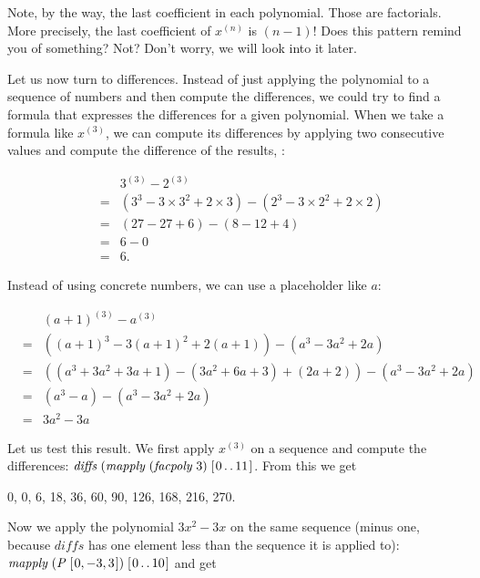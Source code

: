 \documentclass[tikz]{scrreprt}
\newcommand{\Conid}[1]{\mathit{#1}}
\newcommand{\Varid}[1]{\mathit{#1}}
\begin{document}
Note, by the way, the last coefficient in each polynomial.
Those are factorials. More precisely, the last coefficient
of $x^{(n)}$ is $(n-1)!$
Does this pattern remind you of something?
Not? Don't worry, we will look into it later.

Let us now turn to differences.
Instead of just applying the polynomial to a sequence
of numbers and then compute the differences,
we could try to find a formula that expresses
the differences for a given polynomial.
When we take a formula like $x^{(3)}$,
we can compute its differences by
applying two consecutive values
and compute the difference of the results, \eg:

\[
\begin{array}{ccl}
&   & 3^{(3)} - 2^{(3)} \\
& = & (3^3 - 3\times 3^2 + 2\times 3) -
    (2^3 - 3\times 2^2 + 2\times 2)\\
& = & (27 - 27 + 6) - (8 - 12 + 4) \\
& = & 6 - 0\\
& = & 6.
\end{array}
\]

Instead of using concrete numbers, we can use
a placeholder like $a$:

\[
\begin{array}{ccl}
&   & (a+1)^{(3)} - a^{(3)}\\
& = & ((a+1)^3 - 3(a+1)^2 + 2(a+1)) -
      (a^3 - 3a^2 + 2a)\\
& = & ((a^3 +3a^2 + 3a + 1) - (3a^2+6a+3) + (2a+2)) - 
      (a^3 - 3a^2 + 2a)\\
& = & (a^3 - a) - 
      (a^3 - 3a^2 + 2a)\\
& = & 3a^2 - 3a
\end{array}
\]

Let us test this result.
We first apply $x^{(3)}$ on a sequence
and compute the differences:
\ensuremath{\Varid{diffs}\;(\Varid{mapply}\;(\Varid{facpoly}\;\mathrm{3})\;[\mskip1.5mu \mathrm{0}\mathinner{\ldotp\ldotp}\mathrm{11}\mskip1.5mu]}.
From this we get

0, 0, 6, 18, 36, 60, 90, 126, 168, 216, 270.

Now we apply the polynomial $3x^2 - 3x$
on the same sequence (minus one,
because \ensuremath{\Varid{diffs}} has one element less
than the sequence it is applied to): 
\ensuremath{\Varid{mapply}\;(\Conid{P}\;[\mskip1.5mu \mathrm{0},\mathbin{-}\mathrm{3},\mathrm{3}\mskip1.5mu])\;[\mskip1.5mu \mathrm{0}\mathinner{\ldotp\ldotp}\mathrm{10}\mskip1.5mu]}
and get
\end{document}
